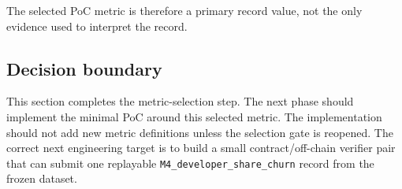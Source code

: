 The selected PoC metric is therefore a primary record value, not the only evidence used to interpret the record.

\subsection{Decision boundary}
\label{sec:selected_metric_decision_boundary}

This section completes the metric-selection step. The next phase should implement the minimal PoC around this
selected metric. The implementation should not add new metric definitions unless the selection gate is reopened.
The correct next engineering target is to build a small contract/off-chain verifier pair that can submit one
replayable \texttt{M4\_developer\_share\_churn} record from the frozen dataset.
